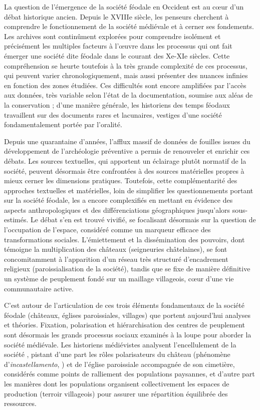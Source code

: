 {\redroman
	La question de l'émergence de la société féodale en Occident est au cœur d'un débat historique ancien.
	Depuis le XVIIIe siècle, les penseurs cherchent à comprendre le fonctionnement de la société médiévale et à cerner ses fondements.
	Les archives sont continûment explorées pour comprendre isolément et précisément les multiples facteurs à l'œuvre dans les processus qui ont fait émerger une société dite \og féodale\fg{} dans le courant des Xe-XIe siècles.
	Cette compréhension se heurte toutefois à la très grande complexité de ces processus, qui peuvent varier chronologiquement, mais aussi présenter des nuances infinies en fonction des zones étudiées.
	Ces difficultés sont encore amplifiées par l'accès aux données, très variable selon l'état de la documentation, soumise aux aléas de la conservation ; d'une manière générale, les historiens des temps féodaux travaillent sur des documents rares et lacunaires, vestiges d'une société fondamentalement portée par l'oralité.
	
	Depuis une quarantaine d'années, l'afflux massif de données de fouilles issues du développement de l'archéologie préventive a permis de renouveler et enrichir ces débats.
	Les sources textuelles, qui apportent un éclairage plutôt normatif de la société, peuvent désormais être confrontées à des sources matérielles propres à mieux cerner les dimensions pratiques.
	Toutefois, cette complémentarité des approches textuelles et matérielles, loin de simplifier les questionnements portant sur la société féodale, les a encore complexifiés en mettant en évidence des aspects anthropologiques et des différenciations géographiques jusqu'alors sous-estimés.
	Le débat s'en est trouvé vivifié, se focalisant désormais sur la question de l'occupation de l'espace, considéré comme un marqueur efficace des transformations sociales.
	L'émiettement et la dissémination des pouvoirs, dont témoigne la multiplication des châteaux (seigneuries châtelaines), se font concomitamment à l'apparition d'un réseau très structuré d'encadrement religieux (paroissialisation de la société), tandis que se fixe de manière définitive un système de peuplement fondé sur un maillage villageois, cœur d'une vie communautaire active.
	
	C'est autour de l'articulation de ces trois éléments fondamentaux de la société féodale (châteaux, églises paroissiales, villages) que portent aujourd'hui analyses et théories.
	Fixation, polarisation et hiérarchisation des centres de peuplement sont désormais les grands processus sociaux examinés à la loupe pour aborder la société médiévale.
	Les historiens médiévistes analysent l'\og encellulement\fg{} de la société \autocite{fossier_enfance_1982}, pistant d'une part les rôles polarisateurs du château (phénomène d'\textit{incastellamento},  \cite{toubert_les_1973}) et de l'église paroissiale accompagnée de son cimetière, considérés comme points de ralliement des populations paysannes, et d'autre part les manières dont les populations organisent collectivement les espaces de production (terroir villageois) pour assurer une répartition équilibrée des ressources.
	
}
